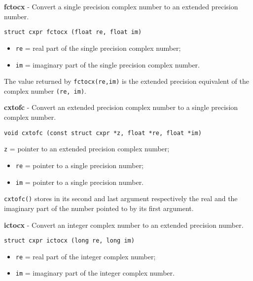 \documentclass{article}
\begin{document}
\hrulefill{}

\textbf{fctocx} - Convert a single precision complex number to
an extended precision number.

\begin{verbatim}
struct cxpr fctocx (float re, float im)
\end{verbatim}

\begin{itemize}
\item \texttt{re} = real part of the single precision complex number;
\item \texttt{im} = imaginary part of the single precision complex number.
\end{itemize}

The value returned by \texttt{fctocx(re,im)} is the
extended precision equivalent of the complex number
\texttt{(re, im)}.


\hrulefill{}

\textbf{cxtofc} - Convert an extended precision complex number to
a single precision complex number.

\begin{verbatim}
void cxtofc (const struct cxpr *z, float *re, float *im)
\end{verbatim}

\texttt{z} = pointer to an extended precision complex number;

\begin{itemize}
\item \texttt{re} = pointer to a single precision number;
\item \texttt{im} = pointer to a single precision number.
\end{itemize}

\texttt{cxtofc()} stores in its second and last argument respectively 
the real and the imaginary part of the number
pointed to by its first argument.


\hrulefill{}

\textbf{ictocx} - Convert an integer complex number to
an extended precision number.

\begin{verbatim}
struct cxpr ictocx (long re, long im)
\end{verbatim}

\begin{itemize}
\item \texttt{re} = real part of the integer complex number;
\item \texttt{im} = imaginary part of the integer complex number.
\end{itemize}
\end{document}
